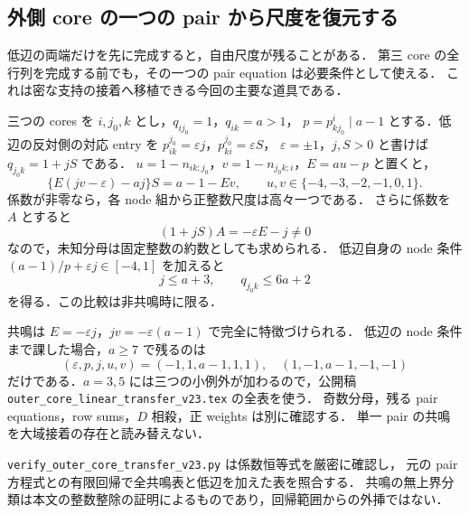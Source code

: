 \subsection{外側 core の一つの pair から尺度を復元する}
\label{noc23:section}

低辺の両端だけを先に完成すると，自由尺度が残ることがある．
第三 core の全行列を完成する前でも，その一つの pair equation は必要条件として使える．
これは密な支持の接着へ移植できる今回の主要な道具である．

三つの cores を $i,j_0,k$ とし，$q_{ij_0}=1$，$q_{ik}=a>1$，
$p=p^i_{kj_0}\mid a-1$ とする．低辺の反対側の対応 entry を
$p^{j_0}_{ik}=\varepsilon j$，$p^{j_0}_{ki}=\varepsilon S$，
$\varepsilon=\pm1$，$j,S>0$ と書けば $q_{j_0k}=1+jS$ である．
$u=1-n_{ik;j_0}$，$v=1-n_{j_0k;i}$，$E=au-p$ と置くと，
\[
 \{E(jv-\varepsilon)-aj\}S=a-1-Ev,
 \qquad u,v\in\{-4,-3,-2,-1,0,1\}.
\]
係数が非零なら，各 node 組から正整数尺度は高々一つである．
さらに係数を $A$ とすると
\[
 (1+jS)A=-\varepsilon E-j\ne0
\]
なので，未知分母は固定整数の約数としても求められる．
低辺自身の node 条件 $(a-1)/p+\varepsilon j\in[-4,1]$ を加えると
\[
 j\le a+3,\qquad q_{j_0k}\le6a+2
\]
を得る．この比較は非共鳴時に限る．

共鳴は $E=-\varepsilon j$，$jv=-\varepsilon(a-1)$ で完全に特徴づけられる．
低辺の node 条件まで課した場合，$a\ge7$ で残るのは
\[
 (\varepsilon,p,j,u,v)=(-1,1,a-1,1,1),\quad
 (1,-1,a-1,-1,-1)
\]
だけである．$a=3,5$ には三つの小例外が加わるので，公開稿
\nolinkurl{outer_core_linear_transfer_v23.tex} の全表を使う．
奇数分母，残る pair equations，row sums，$D$ 相殺，正 weights は別に確認する．
単一 pair の共鳴を大域接着の存在と読み替えない．

\nolinkurl{verify_outer_core_transfer_v23.py} は係数恒等式を厳密に確認し，
元の pair 方程式との有限回帰で全共鳴表と低辺を加えた表を照合する．
共鳴の無上界分類は本文の整数整除の証明によるものであり，回帰範囲からの外挿ではない．
